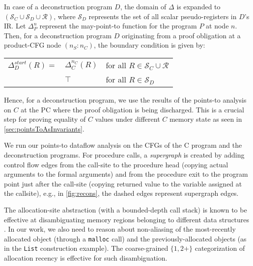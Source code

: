 In case of a deconstruction program $D$, the domain of $\Delta$ is expanded to $(\mathcal{S}_C \cup \mathcal{S}_D \cup \mathcal{R})$,
where $\mathcal{S}_D$ represents the set of all scalar pseudo-registers in $D$'s IR.
Let $\Delta^n_P$ represent the may-point-to function for the program $P$ at node $n$.
Then, for a deconstruction program $D$ originating from a proof obligation
at a product-CFG node $(n_S:n_C)$, the boundary condition is given by:

\begin{center}
\begin{tabular}{rll}
$\Delta^{start}_D(R)=$ & $\Delta^{n_C}_C(R)$ & for all $R \in \mathcal{S}_C \cup \mathcal{R}$ \\
& $\top$ & for all $R \in \mathcal{S}_D$ \\
\end{tabular}
\end{center}

Hence, for a deconstruction program, we use the results of the points-to analysis on $C$ at the PC where
the proof obligation is being discharged. This is a crucial step for proving equality of $C$ values
under different $C$ memory state as seen in \cref{sec:pointsToAsInvariants}.

We run our points-to dataflow analysis on the CFGs of the C program and the deconstruction programs.
For procedure calls, a {\em supergraph} is created by adding control flow edges
from the call-site to the procedure head (copying actual arguments to the formal arguments) and
from the procedure exit to the program point just after the
call-site (copying returned value to the variable assigned at the callsite),
e.g., in \cref{fig:recons}, the dashed edges represent supergraph edges.

The allocation-site abstraction (with a bounded-depth call stack) is
known to be effective at disambiguating memory regions belonging to
different data structures
\cite{allocationSiteAbstraction82,allocationSiteAbstraction90,allocationSiteAbstraction06}.
In our work, we also need to reason about non-aliasing
of the most-recently allocated object (through a {\tt malloc} call) and
the previously-allocated objects (as in the {\tt List}
construction example). The coarse-grained $\{1, 2+\}$
categorization of allocation recency is effective for such
disambiguation.